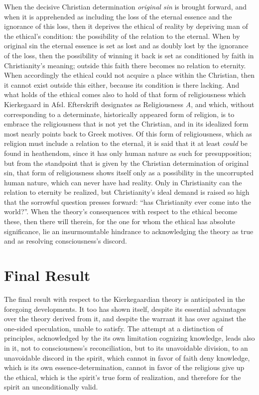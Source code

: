 \documentclass[12pt,a4paper]{book}
\begin{document}
When the decisive Christian determination \emph{original sin} is brought forward, and when it is apprehended as including
the loss of the eternal essence and the ignorance of this loss, then it deprives the ethical of reality by
depriving man of the ethical's condition: the possibility of the relation to the eternal. When by original sin the
eternal essence is set as lost and as doubly lost by the ignorance of the loss, then the possibility of winning it
back is set as conditioned by faith in Christianity's meaning; outside this faith there becomes no relation to
eternity. When accordingly the ethical could not acquire a place within the Christian, then it cannot exist outside
this either, because its condition is there lacking. And what holds of the ethical comes also to hold of that form
of religiousness which Kierkegaard in Afsl. Efterskrift designates as Religiousness \textit{A}, and which, without
corresponding to a determinate, historically appeared form of religion, is to embrace the religiousness that is not
yet the Christian, and in its idealized form most nearly points back to Greek motives. Of this form of religiousness,
which as religion must include a relation to the eternal, it is said that it at least \emph{could} be found in heathendom,
since it has only human nature as such for presupposition; but from the standpoint that is given by the Christian
determination of original sin, that form of religiousness shows itself only as a possibility in the uncorrupted
human nature, which can never have had reality. Only in Christianity can the relation to eternity be realized, but
Christianity's ideal demand is raised so high that the sorrowful question presses forward: ``has Christianity ever
come into the world?''. When the theory's consequences with respect to the ethical become these, then there will
therein, for the one for whom the ethical has absolute significance, lie an insurmountable hindrance to acknowledging
the theory as true and as resolving consciousness's discord.

\section{Final Result}
\label{sec:separation-result}

The final result with respect to the Kierkegaardian theory is anticipated in the foregoing
developments. It too has shown itself, despite its essential advantages over the theory derived
from it, and despite the warrant it has over against the one-sided speculation, unable to satisfy.
The attempt at a distinction of principles, acknowledged by the its own limitation cognizing
knowledge, leads also in it, not to consciousness's reconciliation, but to its unavoidable
division, to an unavoidable discord in the spirit, which cannot in favor of faith deny knowledge,
which is its own essence-determination, cannot in favor of the religious give up the ethical,
which is the spirit's true form of realization, and therefore for the spirit an unconditionally
valid.
\end{document}
